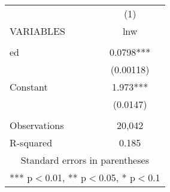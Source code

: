 \begin{tabular}{lc} \hline
 & (1) \\
VARIABLES & lnw \\ \hline
 &  \\
ed & 0.0798*** \\
 & (0.00118) \\
Constant & 1.973*** \\
 & (0.0147) \\
 &  \\
Observations & 20,042 \\
 R-squared & 0.185 \\ \hline
\multicolumn{2}{c}{ Standard errors in parentheses} \\
\multicolumn{2}{c}{ *** p$<$0.01, ** p$<$0.05, * p$<$0.1} \\
\end{tabular}

